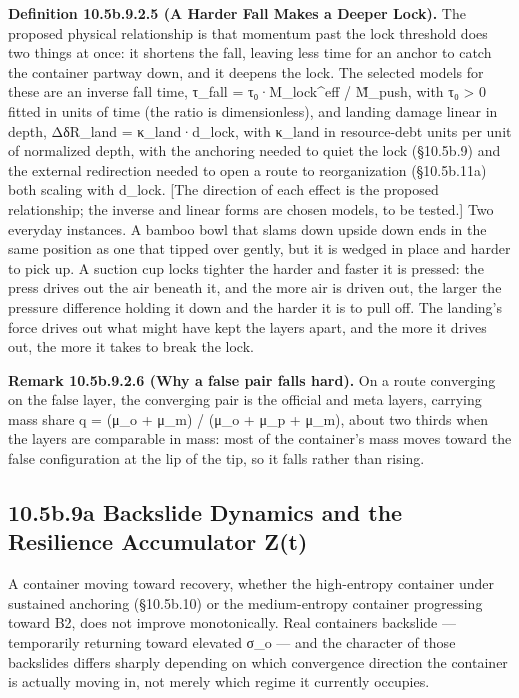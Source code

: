 \documentclass[
]{article}
\begin{document}
\textbf{Definition 10.5b.9.2.5 (A Harder Fall Makes a Deeper Lock).} The
proposed physical relationship is that momentum past the lock threshold
does two things at once: it shortens the fall, leaving less time for an
anchor to catch the container partway down, and it deepens the lock. The
selected models for these are an inverse fall time, τ\_fall =
τ₀·M\_lock\^{}eff / M̃\_push, with τ₀ \textgreater{} 0 fitted in units of
time (the ratio is dimensionless), and landing damage linear in depth,
ΔδR\_land = κ\_land·d\_lock, with κ\_land in resource-debt units per
unit of normalized depth, with the anchoring needed to quiet the lock
(§10.5b.9) and the external redirection needed to open a route to
reorganization (§10.5b.11a) both scaling with d\_lock. {[}The direction
of each effect is the proposed relationship; the inverse and linear
forms are chosen models, to be tested.{]} Two everyday instances. A
bamboo bowl that slams down upside down ends in the same position as one
that tipped over gently, but it is wedged in place and harder to pick
up. A suction cup locks tighter the harder and faster it is pressed: the
press drives out the air beneath it, and the more air is driven out, the
larger the pressure difference holding it down and the harder it is to
pull off. The landing's force drives out what might have kept the layers
apart, and the more it drives out, the more it takes to break the lock.

\textbf{Remark 10.5b.9.2.6 (Why a false pair falls hard).} On a route
converging on the false layer, the converging pair is the official and
meta layers, carrying mass share q = (μ\_o + μ\_m) / (μ\_o + μ\_p +
μ\_m), about two thirds when the layers are comparable in mass: most of
the container's mass moves toward the false configuration at the lip of
the tip, so it falls rather than rising.

\hypertarget{b.9a-backslide-dynamics-and-the-resilience-accumulator-zt}{%
\subsection{10.5b.9a Backslide Dynamics and the Resilience Accumulator
Z(t)}\label{b.9a-backslide-dynamics-and-the-resilience-accumulator-zt}}

A container moving toward recovery, whether the high-entropy container
under sustained anchoring (§10.5b.10) or the medium-entropy container
progressing toward B2, does not improve monotonically. Real containers
backslide --- temporarily returning toward elevated σ\_o --- and the
character of those backslides differs sharply depending on which
convergence direction the container is actually moving in, not merely
which regime it currently occupies.
\end{document}
